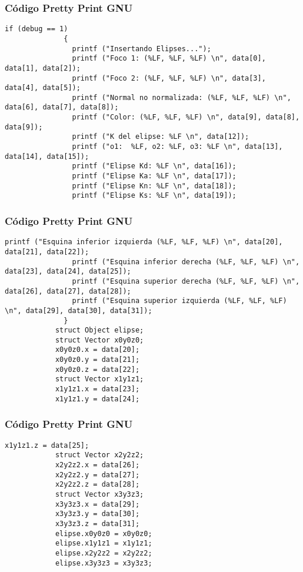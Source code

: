 \documentclass{beamer}
\begin{document}
\begin{frame}[fragile]
\frametitle{C\'odigo Pretty Print GNU}
\begin{lstlisting}[style=CStyle]
            if (debug == 1)
              {
                printf ("Insertando Elipses...");
                printf ("Foco 1: (%LF, %LF, %LF) \n", data[0], data[1], data[2]);
                printf ("Foco 2: (%LF, %LF, %LF) \n", data[3], data[4], data[5]);
                printf ("Normal no normalizada: (%LF, %LF, %LF) \n", data[6], data[7], data[8]);
                printf ("Color: (%LF, %LF, %LF) \n", data[9], data[8], data[9]);
                printf ("K del elipse: %LF \n", data[12]);
                printf ("o1:  %LF, o2: %LF, o3: %LF \n", data[13], data[14], data[15]);
                printf ("Elipse Kd: %LF \n", data[16]);
                printf ("Elipse Ka: %LF \n", data[17]);
                printf ("Elipse Kn: %LF \n", data[18]);
                printf ("Elipse Ks: %LF \n", data[19]);
\end{lstlisting}
\end{frame}
\begin{frame}[fragile]
\frametitle{C\'odigo Pretty Print GNU}
\begin{lstlisting}[style=CStyle]
                printf ("Esquina inferior izquierda (%LF, %LF, %LF) \n", data[20], data[21], data[22]);
                printf ("Esquina inferior derecha (%LF, %LF, %LF) \n", data[23], data[24], data[25]);
                printf ("Esquina superior derecha (%LF, %LF, %LF) \n", data[26], data[27], data[28]);
                printf ("Esquina superior izquierda (%LF, %LF, %LF) \n", data[29], data[30], data[31]);
              }
            struct Object elipse;
            struct Vector x0y0z0;
            x0y0z0.x = data[20];
            x0y0z0.y = data[21];
            x0y0z0.z = data[22];
            struct Vector x1y1z1;
            x1y1z1.x = data[23];
            x1y1z1.y = data[24];
\end{lstlisting}
\end{frame}
\begin{frame}[fragile]
\frametitle{C\'odigo Pretty Print GNU}
\begin{lstlisting}[style=CStyle]
            x1y1z1.z = data[25];
            struct Vector x2y2z2;
            x2y2z2.x = data[26];
            x2y2z2.y = data[27];
            x2y2z2.z = data[28];
            struct Vector x3y3z3;
            x3y3z3.x = data[29];
            x3y3z3.y = data[30];
            x3y3z3.z = data[31];
            elipse.x0y0z0 = x0y0z0;
            elipse.x1y1z1 = x1y1z1;
            elipse.x2y2z2 = x2y2z2;
            elipse.x3y3z3 = x3y3z3;
\end{lstlisting}
\end{frame}
\end{document}
